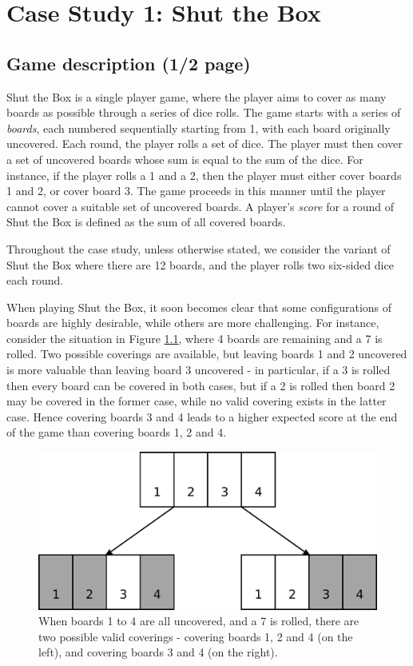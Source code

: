 \chapter{Case Study 1: Shut the Box}
\label{cs1}

\section{Game description (1/2 page)}
\label{cs1:stb_description}
Shut the Box is a single player game, where the player aims to cover as many boards as possible through a series of dice rolls. The game starts with a series of \emph{boards}, each numbered sequentially starting from 1, with each board originally uncovered. Each round, the player rolls a set of dice. The player must then cover a set of uncovered boards whose sum is equal to the sum of the dice. For instance, if the player rolls a 1 and a 2, then the player must either cover boards 1 and 2, or cover board 3. The game proceeds in this manner until the player cannot cover a suitable set of uncovered boards. A player's \emph{score} for a round of Shut the Box is defined as the sum of all covered boards.

Throughout the case study, unless otherwise stated, we consider the variant of Shut the Box where there are 12 boards, and the player rolls two six-sided dice each round.


When playing Shut the Box, it soon becomes clear that some configurations of boards are highly desirable, while others are more challenging. For instance, consider the situation in Figure \ref{cs1:cover_choice}, where 4 boards are remaining and a 7 is rolled. Two possible coverings are available, but leaving boards 1 and 2 uncovered is more valuable than leaving board 3 uncovered - in particular, if a 3 is rolled then every board can be covered in both cases, but if a 2 is rolled then board 2 may be covered in the former case, while no valid covering exists in the latter case. Hence covering boards 3 and 4 leads to a higher expected score at the end of the game than covering boards 1, 2 and 4.

\begin{figure}
    \centering
    \includegraphics[width=0.5\linewidth]{images/cover_choice.pdf}
    \caption{When boards 1 to 4 are all uncovered, and a 7 is rolled, there are two possible valid coverings - covering boards 1, 2 and 4 (on the left), and covering boards 3 and 4 (on the right).}
    \label{cs1:cover_choice}
\end{figure}

